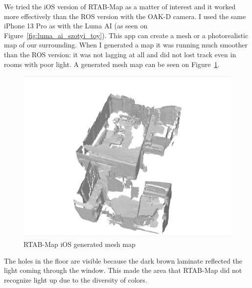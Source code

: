 We tried the iOS version of RTAB-Map as a matter of interest and it worked more effectively than the ROS version with the OAK-D camera. I used the same iPhone 13 Pro as with the Luma AI (as seen on Figure~\ref{fig:luma_ai_szotyi_toy}). This app can create a mesh or a photorealistic map of our surrounding. When I generated a map it was running much smoother than the ROS version: it was not lagging at all and did not lost track even in rooms with poor light. A generated mesh map can be seen on Figure~\ref{fig:rtabmap_ios}.

\begin{figure}[htbp]
	\centering
	\includegraphics[width=150mm, keepaspectratio]{figures/rtabmap_ios.png}
	\caption{RTAB-Map iOS generated mesh map}
	\label{fig:rtabmap_ios}
\end{figure}

The holes in the floor are visible because the dark brown laminate reflected the light coming through the window. This made the area that RTAB-Map did not recognize light up due to the diversity of colors.
